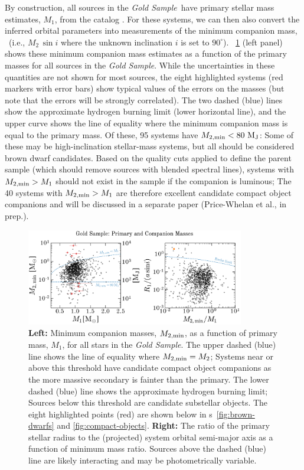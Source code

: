 \documentclass[modern]{aastex63}
\newcommand{\goldsample}{\textit{Gold Sample}}
\begin{document}
By construction, all sources in the \goldsample\ have primary stellar mass
estimates, $M_1$, from the  catalog \citep{Queiroz:2019}.
For these systems, we can then also convert the inferred orbital parameters into
measurements of the minimum companion mass, \mtwomin\ (i.e., $M_2 \, \sin i$
where the unknown inclination $i$ is set to $90^\circ$).
\figurename~\ref{fig:m2m1} (left panel) shows these minimum companion mass
estimates as a function of the  primary masses for all
sources in the \goldsample.
While the uncertainties in these quantities are not shown for most sources, the
eight highlighted systems (red markers with error bars) show typical values of
the errors on the masses (but note that the errors will be strongly correlated).
The two dashed (blue) lines show the approximate hydrogen burning limit (lower
horizontal line), and the upper curve shows the line of equality where the
minimum companion mass is equal to the primary mass.
Of these, 95 systems have $M_{2, {\rm min}} < 80~\mathrm{M}_{\mathrm{J}}$: Some of these may be
high-inclination stellar-mass systems, but all should be considered brown dwarf
candidates.
Based on the quality cuts applied to define the parent sample (which should
remove sources with blended spectral lines), systems with $M_{2, {\rm min}} > M_1$
should not exist in the sample if the companion is luminous; The 40 systems with
$M_{2, {\rm min}} > M_1$ are therefore excellent candidate compact object companions and
will be discussed in a separate paper (Price-Whelan et al., in prep.).

\begin{figure}[t]
    \begin{center}
    \includegraphics[width=0.85\textwidth]{m2_m1_roche.pdf}
    \end{center}
    \caption{%
    \textbf{Left:} Minimum companion masses, $M_{2, {\rm min}}$, as a function of
    primary mass, $M_1$, for all stars in the \goldsample.
    The upper dashed (blue) line shows the line of equality where $M_{2, {\rm min}} =
    M_2$; Systems near or above this threshold have candidate compact object
    companions as the more massive secondary is fainter than the primary.
    The lower dashed (blue) line shows the approximate hydrogen burning limit;
    Sources below this threshold are candidate substellar objects.
    The eight highlighted points (red) are shown below in \figurename
    s~\ref{fig:brown-dwarfs} and \ref{fig:compact-objects}.
    \textbf{Right:} The ratio of the primary stellar radius to the (projected)
    system orbital semi-major axis as a function of minimum mass ratio.
    Sources above the dashed (blue) line are likely interacting and may be
    photometrically variable.
    \label{fig:m2m1}
    }
\end{figure}
\end{document}
